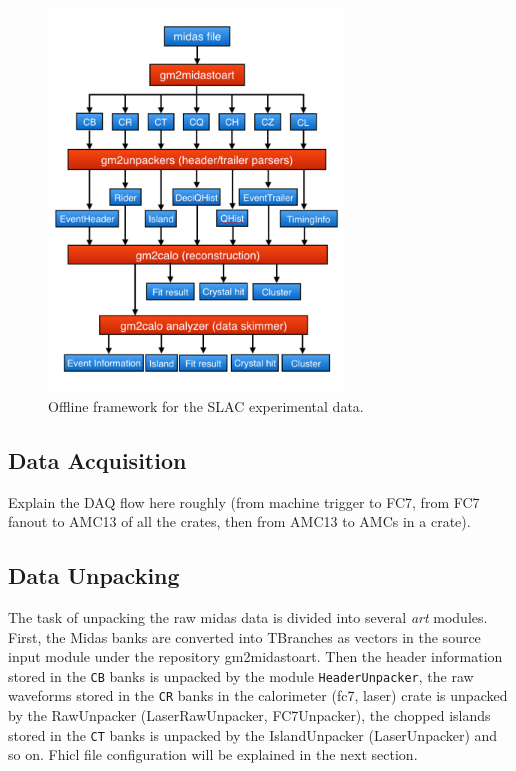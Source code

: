 \begin{figure}[htbp]
\centering
\includegraphics[width=0.7\textwidth]{pics/offline_slac_framework}
\caption{Offline framework for the SLAC experimental data.}
\end{figure}

\subsection{Data Acquisition}
Explain the DAQ flow here roughly (from machine trigger to FC7, from FC7 fanout to AMC13 of all the crates, then from AMC13 to AMCs in a crate).

\subsection{Data Unpacking}
The task of unpacking the raw midas data is divided into several \textit{art} modules. First, the Midas banks are converted into TBranches as vectors in the source input module under the repository gm2midastoart.
Then the header information stored in the \verb+CB+ banks is unpacked by the module \verb+HeaderUnpacker+, 
the raw waveforms stored in the \verb+CR+ banks in the calorimeter (fc7, laser) crate is unpacked by the RawUnpacker (LaserRawUnpacker, FC7Unpacker), the chopped islands stored in the \verb+CT+ banks
is unpacked by the IslandUnpacker (LaserUnpacker) and so on. Fhicl file configuration will be explained in the next section.

